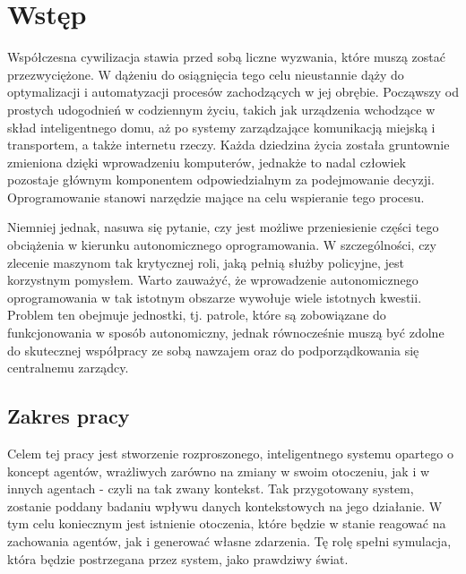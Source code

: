 \chapter{Wstęp}

\par Współczesna cywilizacja stawia przed sobą liczne wyzwania, które muszą zostać przezwyciężone. W dążeniu do osiągnięcia tego celu nieustannie dąży do optymalizacji i automatyzacji procesów zachodzących w jej obrębie. Począwszy od prostych udogodnień w codziennym życiu, takich jak urządzenia wchodzące w skład inteligentnego domu, aż po systemy zarządzające komunikacją miejską i transportem, a także internetu rzeczy. Każda dziedzina życia została gruntownie zmieniona dzięki wprowadzeniu komputerów, jednakże to nadal człowiek pozostaje głównym komponentem odpowiedzialnym za podejmowanie decyzji. Oprogramowanie stanowi narzędzie mające na celu wspieranie tego procesu.

\par Niemniej jednak, nasuwa się pytanie, czy jest możliwe przeniesienie części tego obciążenia w kierunku autonomicznego oprogramowania. W szczególności, czy zlecenie maszynom tak krytycznej roli, jaką pełnią służby policyjne, jest korzystnym pomysłem. Warto zauważyć, że wprowadzenie autonomicznego oprogramowania w tak istotnym obszarze wywołuje wiele istotnych kwestii. Problem ten obejmuje jednostki, tj. patrole, które są zobowiązane do funkcjonowania w sposób autonomiczny, jednak równocześnie muszą być zdolne do skutecznej współpracy ze sobą nawzajem oraz do podporządkowania się centralnemu zarządcy.

\section{Zakres pracy}
\label{sec:zakresPracy}

\par Celem tej pracy jest stworzenie rozproszonego, inteligentnego systemu opartego o koncept agentów, wrażliwych zarówno na zmiany w swoim otoczeniu, jak i w innych agentach - czyli na tak zwany kontekst. Tak przygotowany system, zostanie poddany badaniu wpływu danych kontekstowych na jego działanie. W tym celu koniecznym jest istnienie otoczenia, które będzie w stanie reagować na zachowania agentów, jak i generować własne zdarzenia. Tę rolę spełni symulacja, która będzie postrzegana przez system, jako prawdziwy świat.

